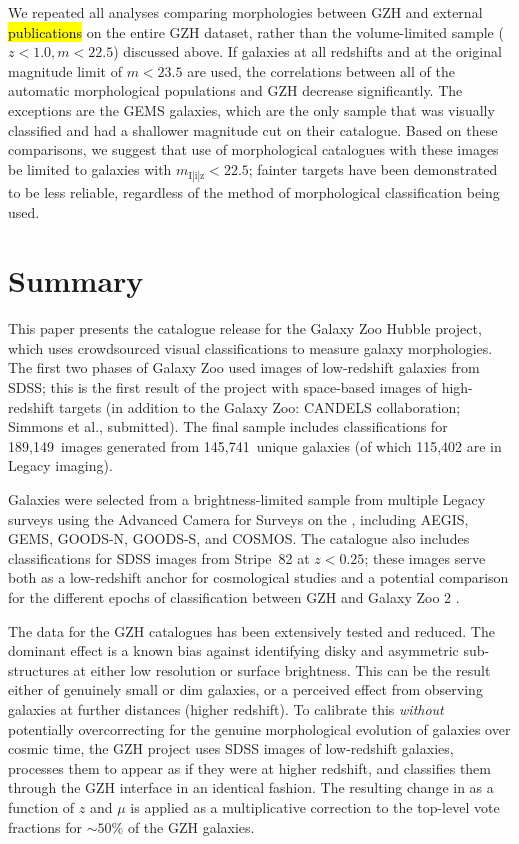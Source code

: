 \documentclass[a4paper,fleqn,usenatbib]{mnras}
\begin{document}
We repeated all analyses comparing morphologies between GZH and external
\hl{publications} on the entire GZH dataset, rather than the volume-limited sample
($z<1.0,m<22.5$) discussed above. If galaxies at all redshifts and at the
original magnitude limit of $m<23.5$ are used, the correlations between all of
the automatic morphological populations and GZH decrease significantly.  The
exceptions are the GEMS galaxies, which are the only sample that was visually
classified and had a shallower magnitude cut on their catalogue.  Based on
these comparisons, we suggest that use of morphological catalogues with these
\hst{} images be limited to galaxies with $m_\mathrm{I|i|z}<22.5$; fainter
targets have been demonstrated to be less reliable, regardless of the method of
morphological classification being used.

\section{Summary}\label{sec:summary}


This paper presents the catalogue release for the Galaxy Zoo Hubble project,
which uses crowdsourced visual classifications to measure galaxy morphologies.
The first two phases of Galaxy Zoo \citep{lin11,wil13} used images of
low-redshift galaxies from SDSS; this is the first result of the project with
space-based images of high-redshift targets (in addition to the Galaxy Zoo:
CANDELS collaboration; Simmons et al., submitted). The final sample includes
classifications for 189,149~images generated from 145,741~unique galaxies
(of which 115,402 are in \hst{} Legacy imaging).

Galaxies were selected from a brightness-limited sample from multiple Legacy
surveys using the Advanced Camera for Surveys on the \hubble,
including AEGIS, GEMS, GOODS-N, GOODS-S, and COSMOS. The catalogue also includes
classifications for SDSS images from Stripe~82 at $z<0.25$; these images
serve both as a low-redshift anchor for
cosmological studies and a potential comparison for the different epochs of
classification between GZH and Galaxy Zoo 2 \citep{wil13}. 

The data for the GZH catalogues has been extensively tested and reduced. The
dominant effect is a known bias against identifying disky and asymmetric
sub-structures at either low resolution or surface brightness. This can be the
result either of genuinely small or dim galaxies, or a perceived effect from
observing galaxies at further distances (higher redshift). To calibrate this
\emph{without} potentially overcorrecting for the genuine morphological
evolution of galaxies over cosmic time, the GZH project uses SDSS images of
low-redshift galaxies, processes them to appear as if they were at higher
redshift, and classifies them through the GZH interface in an identical
fashion. The resulting change in \ffeatures{} as a function of $z$ and $\mu$ is
applied as a multiplicative correction to the top-level vote fractions for
$\sim50\%$ of the GZH galaxies. 
\end{document}
